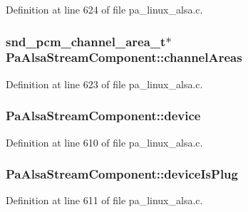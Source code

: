 Definition at line 624 of file pa\+\_\+linux\+\_\+alsa.\+c.

\subsubsection[{\texorpdfstring{channel\+Areas}{channelAreas}}]{\setlength{\rightskip}{0pt plus 5cm}snd\+\_\+pcm\+\_\+channel\+\_\+area\+\_\+t$\ast$ Pa\+Alsa\+Stream\+Component\+::channel\+Areas}\hypertarget{struct_pa_alsa_stream_component_a2d71df829f17e013719fe804a3def576}{}\label{struct_pa_alsa_stream_component_a2d71df829f17e013719fe804a3def576}


Definition at line 623 of file pa\+\_\+linux\+\_\+alsa.\+c.

\subsubsection[{\texorpdfstring{device}{device}}]{ Pa\+Alsa\+Stream\+Component\+::device}\hypertarget{struct_pa_alsa_stream_component_a7194a0ca74245ec54df327760b54d94e}{}\label{struct_pa_alsa_stream_component_a7194a0ca74245ec54df327760b54d94e}


Definition at line 610 of file pa\+\_\+linux\+\_\+alsa.\+c.

\subsubsection[{\texorpdfstring{device\+Is\+Plug}{deviceIsPlug}}]{ Pa\+Alsa\+Stream\+Component\+::device\+Is\+Plug}\hypertarget{struct_pa_alsa_stream_component_a551815cd6a86d58ea632f63e8962c5dd}{}\label{struct_pa_alsa_stream_component_a551815cd6a86d58ea632f63e8962c5dd}


Definition at line 611 of file pa\+\_\+linux\+\_\+alsa.\+c.

